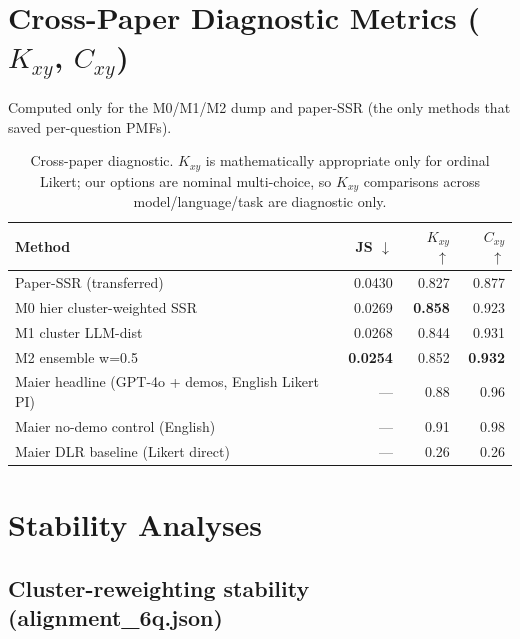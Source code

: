 \documentclass[10pt,a4paper]{article}
\newcommand{\good}[1]{\textcolor{green!50!black}{\textbf{#1}}}
\begin{document}
\section{Cross-Paper Diagnostic Metrics ($K_{xy}$, $C_{xy}$)}

Computed only for the M0/M1/M2 dump and paper-SSR (the only methods that saved per-question PMFs).

\begin{table}[H]
\centering
\small
\begin{tabular}{l r r r}
\toprule
\textbf{Method} & \textbf{JS} $\downarrow$ & \textbf{$K_{xy}$} $\uparrow$ & \textbf{$C_{xy}$} $\uparrow$ \\
\midrule
Paper-SSR (transferred) & 0.0430 & 0.827 & 0.877 \\
M0 hier cluster-weighted SSR & 0.0269 & \good{0.858} & 0.923 \\
M1 cluster LLM-dist & 0.0268 & 0.844 & 0.931 \\
M2 ensemble w=0.5 & \good{0.0254} & 0.852 & \good{0.932} \\
\midrule
Maier headline (GPT-4o + demos, English Likert PI) & --- & 0.88 & 0.96 \\
Maier no-demo control (English) & --- & 0.91 & 0.98 \\
Maier DLR baseline (Likert direct) & --- & 0.26 & 0.26 \\
\bottomrule
\end{tabular}
\caption{Cross-paper diagnostic. $K_{xy}$ is mathematically appropriate only for ordinal Likert; our options are nominal multi-choice, so $K_{xy}$ comparisons across model/language/task are diagnostic only.}
\end{table}

\section{Stability Analyses}

\subsection{Cluster-reweighting stability (alignment\_6q.json)}
\end{document}
